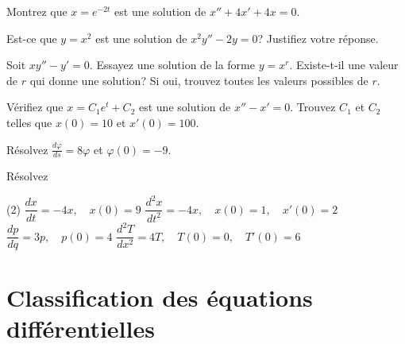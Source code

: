 \begin{exercise}
	Montrez que $x = e^{-2t}$ est une solution de $x'' + 4x' + 4x = 0$.
\end{exercise}

\begin{exercise}
	Est-ce que $y = x^2$ est une solution de $x^2y'' - 2y = 0$?  Justifiez votre réponse.
\end{exercise}

\begin{exercise}
	Soit $xy'' - y' = 0$.  Essayez une solution de la forme $y = x^r$.
	Existe-t-il une valeur de $r$ qui donne une solution?
	Si oui, trouvez toutes les valeurs possibles de $r$.
\end{exercise}


\begin{exercise}
	Vérifiez que $x=C_1e^t+C_2$ est une solution de $x''-x' = 0$.
	Trouvez $C_1$ et $C_2$ telles que $x(0) = 10$ et $x'(0) = 100$.
\end{exercise}

\begin{exercise}
	Résolvez $\frac{d\varphi}{ds} = 8 \varphi$ et $\varphi(0) = -9$.
\end{exercise}

\begin{exercise}
	Résolvez
	\begin{tasks}(2)
	\task $\dfrac{dx}{dt} = -4x, \quad x(0)=9$
	\task $\dfrac{d^2x}{dt^2} = -4x, \quad x(0)=1, \quad x'(0)=2$
	\task $\dfrac{dp}{dq} = 3 p, \quad p(0)=4$
	\task $\dfrac{d^2T}{dx^2} = 4 T, \quad T(0)=0, \quad T'(0)=6$
	\end{tasks}
\end{exercise}


\sectionnewpage
\section{Classification des équations différentielles}
\label{classification:section}

